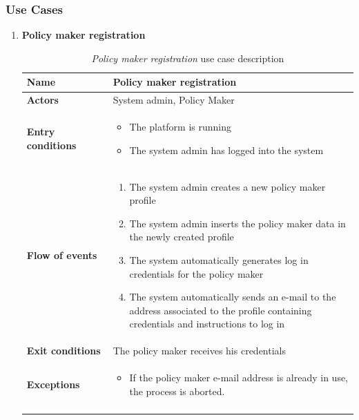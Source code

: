 \documentclass[10pt]{article}
\begin{document}
\subsubsection{Use Cases}
\begin{enumerate}[label=\textbf{UC\arabic*}]
    \item \label{uc:uc1} \textbf{Policy maker registration}
        \begin{longtable}{p{0.26\linewidth}p{0.75\linewidth}}
            \toprule
            \textbf{Name} & \textbf{Policy maker registration} \\
            \midrule
            \textbf{Actors} & System admin, Policy Maker\\
            \midrule
            \textbf{Entry conditions} &
            \begin{itemize}
                \item The platform is running
                \item The system admin has logged into the system
            \end{itemize}\\
            \midrule
            \textbf{Flow of events} & 
            \begin{enumerate}
                \item The system admin creates a new policy maker profile
                \item The system admin inserts the policy maker data in the newly created profile
                \item The system automatically generates log in credentials for the policy maker
                \item The system automatically sends an e-mail to the address associated to the profile containing credentials and instructions to log in
            \end{enumerate} \\
            \midrule
            \textbf{Exit conditions} & The policy maker receives his credentials\\
            \midrule
            \textbf{Exceptions} & 
            \begin{itemize}
                \item If the policy maker e-mail address is already in use, the process is aborted.
            \end{itemize} \\
            \bottomrule
            \caption{\emph{Policy maker registration} use case description}
        \end{longtable}

\end{enumerate}
\end{document}
